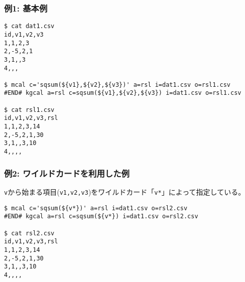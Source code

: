 
\subsubsection*{例1: 基本例}


\begin{Verbatim}[baselinestretch=0.7,frame=single]
$ cat dat1.csv
id,v1,v2,v3
1,1,2,3
2,-5,2,1
3,1,,3
4,,,

$ mcal c='sqsum(${v1},${v2},${v3})' a=rsl i=dat1.csv o=rsl1.csv
#END# kgcal a=rsl c=sqsum(${v1},${v2},${v3}) i=dat1.csv o=rsl1.csv

$ cat rsl1.csv
id,v1,v2,v3,rsl
1,1,2,3,14
2,-5,2,1,30
3,1,,3,10
4,,,,
\end{Verbatim}

\subsubsection*{例2: ワイルドカードを利用した例}

\verb|v|から始まる項目(\verb|v1,v2,v3|)をワイルドカード「\verb|v*|」によって指定している。

\begin{Verbatim}[baselinestretch=0.7,frame=single]
$ mcal c='sqsum(${v*})' a=rsl i=dat1.csv o=rsl2.csv
#END# kgcal a=rsl c=sqsum(${v*}) i=dat1.csv o=rsl2.csv

$ cat rsl2.csv
id,v1,v2,v3,rsl
1,1,2,3,14
2,-5,2,1,30
3,1,,3,10
4,,,,
\end{Verbatim}
